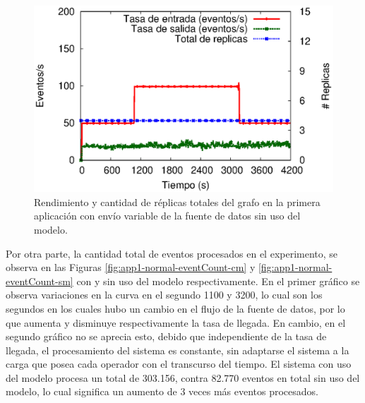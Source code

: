 \begin{figure}[!ht]
	\centering
	\includegraphics[scale=0.7]{images/exp/app1/normal/sm/processSystem.eps}
    \caption{Rendimiento y cantidad de réplicas totales del grafo en la primera aplicación con envío variable de la fuente de datos sin uso del modelo.}
	\label{fig:app1-normal-processSystem-sm}
\end{figure}

Por otra parte, la cantidad total de eventos procesados en el experimento, se observa en las Figuras \ref{fig:app1-normal-eventCount-cm} y \ref{fig:app1-normal-eventCount-sm} con y sin uso del modelo respectivamente. En el primer gráfico se observa variaciones en la curva en el segundo 1100 y 3200, lo cual son los segundos en los cuales hubo un cambio en el flujo de la fuente de datos, por lo que aumenta y disminuye respectivamente la tasa de llegada. En cambio, en el segundo gráfico no se aprecia esto, debido que independiente de la tasa de llegada, el procesamiento del sistema es constante, sin adaptarse el sistema a la carga que posea cada operador con el transcurso del tiempo. El sistema con uso del modelo procesa un total de 303.156, contra 82.770 eventos en total sin uso del modelo, lo cual significa un aumento de 3 veces más eventos procesados.

